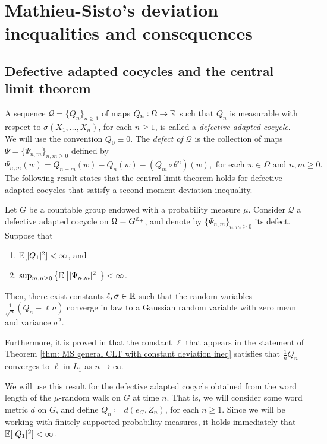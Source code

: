 \section{Mathieu-Sisto's deviation inequalities and consequences}
\subsection{Defective adapted cocycles and the central limit theorem}

A sequence $\mathcal{Q}=\{Q_n\}_{n\ge 1}$ of maps $Q_n:\Omega\to \mathbb{R}$ such that $Q_n$ is measurable with respect to $\sigma(X_1,\ldots, X_n)$, for each $n\ge 1$, is called a \emph{defective adapted cocycle}. We will use the convention $Q_0\equiv 0.$ The \emph{defect of $\mathcal{Q}$} is the collection of maps $\Psi=\{\Psi_{n,m}\}_{n,m\ge 0}$ defined by
\[
\Psi_{n,m}(w)=Q_{n+m}(w)-Q_n(w)-(Q_m\circ \theta^n)(w), \text{ for each }w\in \Omega \text{ and }n,m\ge 0.
\] 
The following result states that the central limit theorem holds for defective adapted cocycles that satisfy a second-moment deviation inequality.


\begin{thm} \label{thm: MS general CLT with constant deviation ineq}
	Let $G$ be a countable group endowed with a probability measure $\mu$. Consider $\mathcal{Q}$ a defective adapted cocycle on $\Omega=G^{\mathbb{Z}_{+}}$, and denote by $\{\Psi_{n,m}\}_{n,m\ge 0}$ its defect. Suppose that
	\begin{enumerate}
		\item $\mathbb{E}[|Q_1|^{2}]<\infty$, and
		\item 	$\sup_{m,n\ge 0} \left\{ \mathbb{E}\left[|\Psi_{n,m}|^2\right]\right\} <\infty$.
	\end{enumerate}
	
	Then, there exist constants $\ell,\sigma\in \mathbb{R}$ such that the random variables $\frac{1}{\sqrt{n}}\left(Q_n-\ell n\right)$ converge in law to a Gaussian random variable with zero mean and variance $\sigma^2$.
\end{thm}

Furthermore, it is proved in \cite[Theorem 3.3]{MathieuSisto2020} that the constant $\ell$ that appears in the statement of Theorem \ref{thm: MS general CLT with constant deviation ineq} satisfies that $\frac{1}{n}Q_n$ converges to $\ell$ in $L_1$ as $n\to \infty$.  


We will use this result for the defective adapted cocycle obtained from the word length of the $\mu$-random walk on $G$ at time $n$. That is, we will consider some word metric $d$ on $G$, and define $Q_n\coloneqq d(e_G,Z_n)$, for each $n\ge 1$. Since we will be working with finitely supported probability measures, it holds immediately that $\mathbb{E}[|Q_1|^2]<\infty$. 


